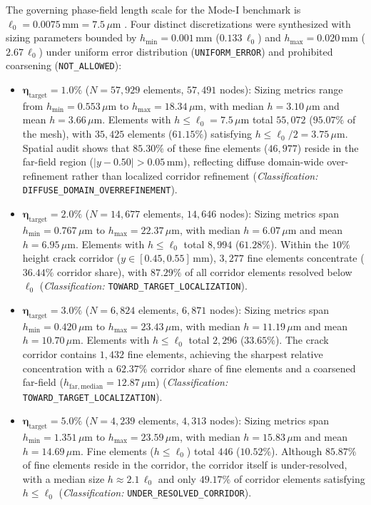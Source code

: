 The governing phase-field length scale for the Mode-I benchmark is $\ell_0 = 0.0075\,\mathrm{mm} = 7.5\,\mu\mathrm{m}$ \citep{pandey2025}. Four distinct discretizations were synthesized with sizing parameters bounded by $h_{\min} = 0.001\,\mathrm{mm}$ ($0.133\,\ell_0$) and $h_{\max} = 0.020\,\mathrm{mm}$ ($2.67\,\ell_0$) under uniform error distribution (\texttt{UNIFORM\_ERROR}) and prohibited coarsening (\texttt{NOT\_ALLOWED}):
\begin{itemize}
  \item $\mathbf{\eta_{\mathrm{target}} = 1.0\%}$ ($N = 57{,}929$ elements, $57{,}491$ nodes): Sizing metrics range from $h_{\min} = 0.553\,\mu\mathrm{m}$ to $h_{\max} = 18.34\,\mu\mathrm{m}$, with median $h = 3.10\,\mu\mathrm{m}$ and mean $h = 3.66\,\mu\mathrm{m}$. Elements with $h \le \ell_0 = 7.5\,\mu\mathrm{m}$ total $55{,}072$ ($95.07\%$ of the mesh), with $35{,}425$ elements ($61.15\%$) satisfying $h \le \ell_0/2 = 3.75\,\mu\mathrm{m}$. Spatial audit shows that $85.30\%$ of these fine elements ($46{,}977$) reside in the far-field region ($|y - 0.50| > 0.05\,\mathrm{mm}$), reflecting diffuse domain-wide over-refinement rather than localized corridor refinement (\textit{Classification:} \texttt{DIFFUSE\_DOMAIN\_OVERREFINEMENT}).
  \item $\mathbf{\eta_{\mathrm{target}} = 2.0\%}$ ($N = 14{,}677$ elements, $14{,}646$ nodes): Sizing metrics span $h_{\min} = 0.767\,\mu\mathrm{m}$ to $h_{\max} = 22.37\,\mu\mathrm{m}$, with median $h = 6.07\,\mu\mathrm{m}$ and mean $h = 6.95\,\mu\mathrm{m}$. Elements with $h \le \ell_0$ total $8{,}994$ ($61.28\%$). Within the $10\%$ height crack corridor ($y \in [0.45, 0.55]\,\mathrm{mm}$), $3{,}277$ fine elements concentrate ($36.44\%$ corridor share), with $87.29\%$ of all corridor elements resolved below $\ell_0$ (\textit{Classification:} \texttt{TOWARD\_TARGET\_LOCALIZATION}).
  \item $\mathbf{\eta_{\mathrm{target}} = 3.0\%}$ ($N = 6{,}824$ elements, $6{,}871$ nodes): Sizing metrics span $h_{\min} = 0.420\,\mu\mathrm{m}$ to $h_{\max} = 23.43\,\mu\mathrm{m}$, with median $h = 11.19\,\mu\mathrm{m}$ and mean $h = 10.70\,\mu\mathrm{m}$. Elements with $h \le \ell_0$ total $2{,}296$ ($33.65\%$). The crack corridor contains $1{,}432$ fine elements, achieving the sharpest relative concentration with a $62.37\%$ corridor share of fine elements and a coarsened far-field ($h_{\mathrm{far,median}} = 12.87\,\mu\mathrm{m}$) (\textit{Classification:} \texttt{TOWARD\_TARGET\_LOCALIZATION}).
  \item $\mathbf{\eta_{\mathrm{target}} = 5.0\%}$ ($N = 4{,}239$ elements, $4{,}313$ nodes): Sizing metrics span $h_{\min} = 1.351\,\mu\mathrm{m}$ to $h_{\max} = 23.59\,\mu\mathrm{m}$, with median $h = 15.83\,\mu\mathrm{m}$ and mean $h = 14.69\,\mu\mathrm{m}$. Fine elements ($h \le \ell_0$) total $446$ ($10.52\%$). Although $85.87\%$ of fine elements reside in the corridor, the corridor itself is under-resolved, with a median size $h \approx 2.1\,\ell_0$ and only $49.17\%$ of corridor elements satisfying $h \le \ell_0$ (\textit{Classification:} \texttt{UNDER\_RESOLVED\_CORRIDOR}).
\end{itemize}

